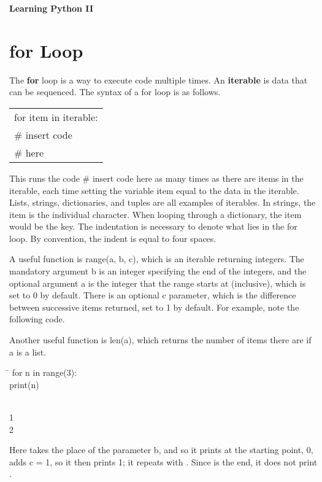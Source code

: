 \documentclass{article}
\newcommand{\icode}[1]{{\ttfamily #1}}
\newenvironment{code}{\begin{tcolorbox}\ttfamily}{\end{tcolorbox}}
\newenvironment{out}{\begin{tcolorbox}[colback=output]\ttfamily}{\end{tcolorbox}}
\begin{document}
\begin{center}
	{\LARGE\textbf{Learning Python II}}
\end{center}
\vspace{0.5 cm}
\section{\icode{for} Loop}
The \icode{\textbf{for}} loop is a way to execute code multiple times. An \textbf{iterable} is data that can be sequenced. The syntax of a \icode{for} loop is as follows.
\begin{center} \ttfamily
\begin{tabular}{|l}
for item in iterable:\\
\hspace{2 em}\# insert code\\
\hspace{2 em}\# here
\end{tabular}
\end{center}
This runs the code \icode{\# insert code here} as many times as there are items in the \icode{iterable}, each time setting the variable \icode{item} equal to the data in the iterable. Lists, strings, dictionaries, and tuples are all examples of iterables. In strings, the item is the individual character. When looping through a dictionary, the item would be the key. The indentation is necessary to denote what lies in the for loop. By convention, the indent is equal to four spaces.

A useful function is \icode{range(a, b, c)}, which is an iterable returning integers. The mandatory argument \icode{b} is an integer specifying the end of the integers, and the optional argument \icode{a} is the integer that the \icode{range} starts at (inclusive), which is set to 0 by default. There is an optional \icode{c} parameter, which is the difference between successive items returned, set to 1 by default. For example, note the following code.

Another useful function is \icode{len(a)}, which returns the number of items there are if \icode{a} is a list.

\begin{code}
\begin{tabbing}
	\hspace{3.25 in}\=\hspace{3.25 in} \kill
	for n in range(3):\>\\
	\hspace{2 em}print(n)\>
\end{tabbing}
\end{code}
\begin{out}
0\\
1\\
2
\end{out}
Here \icode{3} takes the place of the parameter \icode{b}, and so it prints at the starting point, 0, adds \icode{c = 1}, so it then prints 1; it repeats with \icode{2}. Since \icode{3} is the end, it does not print \icode{3}.
\end{document}
